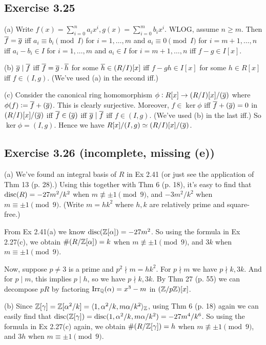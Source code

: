 \documentclass[../Marcus.tex]{subfiles}
\begin{document}
\subsection*{Exercise 3.25}

(a) Write $f(x)=\sum_{i=0}^n a_ix^i,g(x)=\sum_{i=0}^m b_ix^i$. WLOG, assume $n\geq m$. Then $\overline{f}=\overline{g}$ iff $a_i\equiv b_i\pmod{I}$ for $i=1,\ldots,m$ and $a_i\equiv 0\pmod{I}$ for $i=m+1,\ldots,n$ iff $a_i-b_i\in I$ for $i=1,\ldots,m$ and $a_i\in I$ for $i=m+1,\ldots,n$ iff $f-g\in I[x]$.

(b) $\overline{g}\mid\overline{f}$ iff $\overline{f}=\overline{g}\cdot\overline{h}$ for some $\overline{h}\in (R/I)[x]$ iff $f-gh\in I[x]$ for some $h\in R[x]$ iff $f\in(I,g)$. (We've used (a) in the second iff.)

(c) Consider the canonical ring homomorphism $\phi:R[x]\to(R/I)[x]/(\overline{g})$ where $\phi(f):=\overline{f}+(\overline{g})$. This is clearly surjective. Moreover, $f\in\ker\phi$ iff $\overline{f}+(\overline{g})=0$ in $(R/I)[x]/(\overline{g})$ iff $\overline{f}\in(\overline{g})$ iff $\overline{g}\mid\overline{f}$ iff $f\in(I,g)$. (We've used (b) in the last iff.) So $\ker\phi=(I,g)$. Hence we have $R[x]/(I,g)\simeq (R/I)[x]/(\overline{g})$.

\subsection*{Exercise 3.26 \color{red}(incomplete, missing (e))}

(a) We've found an integral basis of $R$ in Ex 2.41 (or just see the application of Thm 13 (p. 28).) Using this together with Thm 6 (p. 18), it's easy to find that $\operatorname{disc}(R)=-27m^2/k^2$ when $m\not\equiv \pm1 \pmod{9}$, and
$-3m^2/k^2$ when $m\equiv \pm1 \pmod{9}$. (Write $m=hk^2$ where $h,k$ are relatively prime and square-free.)

From Ex 2.41(a) we know $\operatorname{disc}(\mathbb{Z}[\alpha])=-27m^2$. So using the formula in Ex 2.27(c), we obtain $\#(R/\mathbb{Z}[\alpha])=k$ when $m\not\equiv \pm1 \pmod{9}$, and $3k$ when $m\equiv \pm1 \pmod{9}$.

Now, suppose $p\neq 3$ is a prime and $p^2\nmid m=hk^2$. For $p\nmid m$ we have $p\nmid k,3k$. And for $p\mid m$, this implies $p\mid h$, so we have $p\nmid k,3k$. By Thm 27 (p. 55) we can decompose $pR$ by factoring $\operatorname{Irr}_{\mathbb{Q}}(\alpha)=x^3-m$ in $(\mathbb{Z}/p\mathbb{Z})[x]$.

(b) Since $\mathbb{Z}[\gamma]=\mathbb{Z}[\alpha^2/k]=\langle1,\alpha^2/k,m\alpha/k^2\rangle_{\mathbb{Z}}$, using Thm 6 (p. 18) again we can easily find that $\operatorname{disc}(\mathbb{Z}[\gamma])=\operatorname{disc}(1,\alpha^2/k,m\alpha/k^2)=-27m^4/k^6$. So using the formula in Ex 2.27(c) again, we obtain $\#(R/\mathbb{Z}[\gamma])=h$ when $m\not\equiv \pm1 \pmod{9}$, and $3h$ when $m\equiv \pm1 \pmod{9}$.
\end{document}
